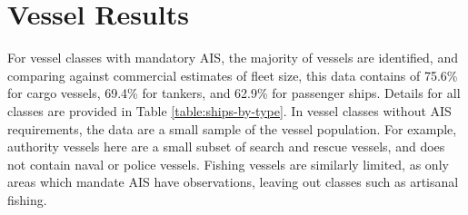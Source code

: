 

\section{Vessel Results}

For vessel classes with mandatory AIS, the majority of vessels are identified, and comparing against commercial estimates of fleet size, this data contains of 75.6\% for cargo vessels, 69.4\% for tankers, and 62.9\% for passenger ships. Details for all classes are provided in Table \ref{table:ships-by-type}.  In vessel classes without AIS requirements, the data are a small sample of the vessel population. For example, authority vessels here are a small subset of search and rescue vessels, and does not contain naval or police vessels. Fishing vessels are similarly limited, as only areas which mandate AIS have observations, leaving out classes such as artisanal fishing. 

